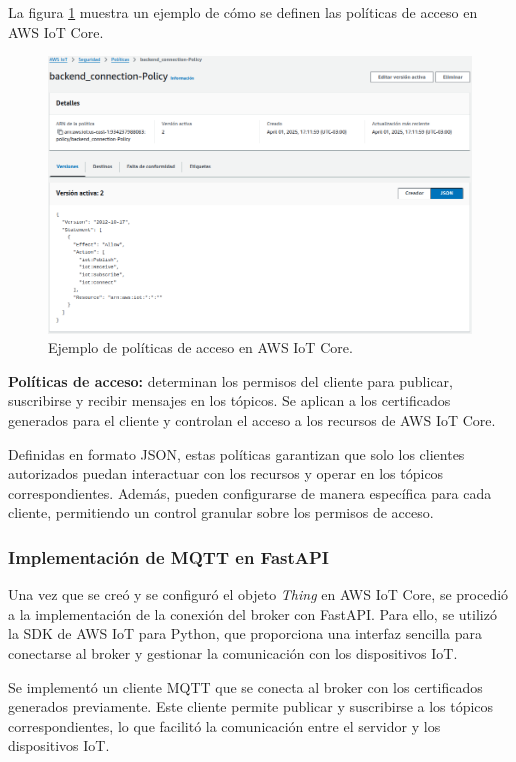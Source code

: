 La figura \ref{fig:aws_iot_policies} muestra un ejemplo de cómo se definen las
políticas de acceso en AWS IoT Core.
\begin{figure}[H]
    \centering
    \includegraphics[width=.99\textwidth]{./Images/18.png}
    \caption{Ejemplo de políticas de acceso en AWS IoT Core.}
    \label{fig:aws_iot_policies}
\end{figure}

\textbf{Políticas de acceso:} determinan los permisos del cliente para publicar,
suscribirse y recibir mensajes en los tópicos. Se aplican a los certificados
generados para el cliente y controlan el acceso a los recursos de AWS IoT Core.

Definidas en formato JSON, estas políticas garantizan que solo los clientes
autorizados puedan interactuar con los recursos y operar en los tópicos
correspondientes. Además, pueden configurarse de manera específica para cada
cliente, permitiendo un control granular sobre los permisos de acceso.

\subsubsection{Implementación de MQTT en FastAPI}
Una vez que se creó y se configuró el objeto \textit{Thing} en AWS IoT Core, se
procedió a la implementación de la conexión del broker con FastAPI. Para ello,
se utilizó la SDK de AWS IoT para Python, que proporciona una interfaz sencilla
para conectarse al broker y gestionar la comunicación con los dispositivos IoT.

Se implementó un cliente MQTT que se conecta al broker con los certificados
generados previamente. Este cliente permite publicar y suscribirse a los
tópicos correspondientes, lo que facilitó la comunicación entre el servidor y
los dispositivos IoT.

